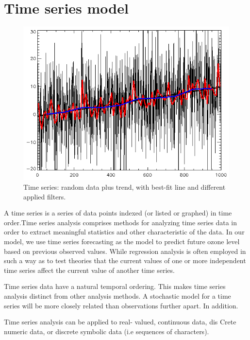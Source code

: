 \documentclass[12pt]{article}
\begin{document}
\section{Time series model}
\begin{center}
\begin{figure}[htpb]
\centering
\includegraphics[scale=0.45]{ts_model}
\caption{Time series: random data plus trend, with best-fit line and different applied filters.}\label{fig:ts_exam}
\end{figure}
\end{center}
A time series is a series of data points indexed (or listed or graphed) in time order.Time series analysis comprises methods for analyzing time series data in order to extract meaningful statistics and other characteristic of the data. In our model, we use time series forecasting as the model to predict future ozone level based on previous observed values. While regression analysis is often employed in such a way as to test theories that the current values of one or more independent time series affect the current value of another time series.\cite{temis.nl} \cite{Holt-Winters-Forecasting}

Time series data have a natural temporal ordering. This makes time series analysis distinct from other analysis methods. A stochastic model for a time series will be more closely related than observations further apart. In addition. 

Time series analysis can be applied to real- valued, continuous data, dis Crete numeric data, or discrete symbolic data (i.e sequences of characters).
\end{document}
